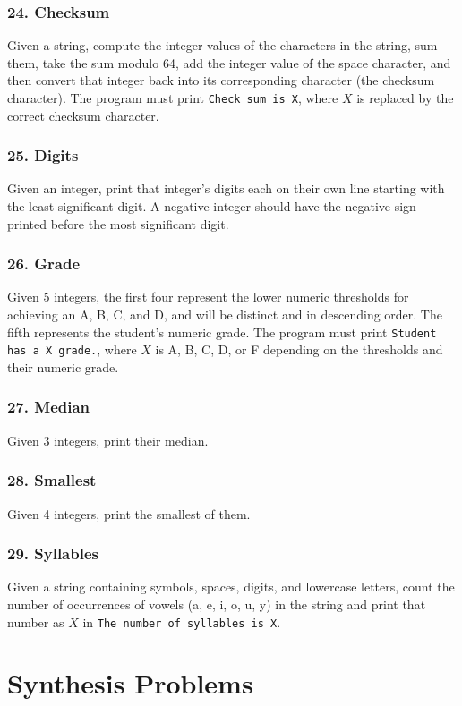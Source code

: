 \documentclass{sig-alternate}
\begin{document}
\subsubsection*{24. Checksum}
Given a string, compute the integer values of the characters in the string, sum them, take the sum modulo 64, add the integer value of the space character, and then convert that integer back into its corresponding character (the checksum character). The program must print \texttt{Check sum is X}, where $X$ is replaced by the correct checksum character.

\subsubsection*{25. Digits}
Given an integer, print that integer's digits each on their own line starting with the least significant digit. A negative integer should have the negative sign printed before the most significant digit.

\subsubsection*{26. Grade}
Given 5 integers, the first four represent the lower numeric thresholds for achieving an A, B, C, and D, and will be distinct and in descending order. The fifth represents the student's numeric grade. The program must print \texttt{Student has a X grade.}, where $X$ is A, B, C, D, or F depending on the thresholds and their numeric grade.

\subsubsection*{27. Median}
Given 3 integers, print their median.

\subsubsection*{28. Smallest}
Given 4 integers, print the smallest of them.

\subsubsection*{29. Syllables}
Given a string containing symbols, spaces, digits, and lowercase letters, count the number of occurrences of vowels (a, e, i, o, u, y) in the string and print that number as $X$ in \texttt{The number of syllables is X}.

\section{Synthesis Problems} \label{synthProbSpec}
\end{document}
